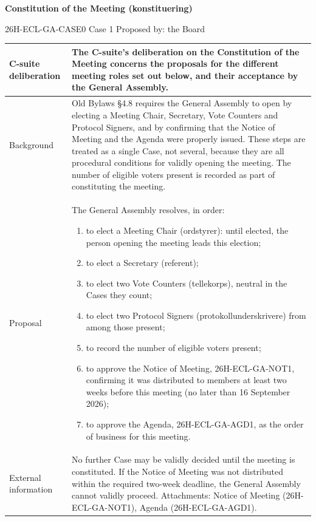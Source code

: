 \documentclass{../../../Common/Latex/Templates/rapport}
\begin{document}
\reportmainmatter
\small
\setlength{\parindent}{0pt}
\setlength{\tabcolsep}{6pt}
\renewcommand{\arraystretch}{1.2}

\begin{center}
  {\Large\bfseries Constitution of the Meeting (konstituering)}\par
  \vspace{0.15cm}
  {\normalsize 26H-ECL-GA-CASE0 \textperiodcentered{} Case 1 \textperiodcentered{} Proposed by: the Board}\par
  \vspace{0.1cm}
  {\small \meetingline}\par
\end{center}

\vspace{0.3cm}
\begin{tabularx}{\textwidth}{|>{\bfseries\raggedright\arraybackslash}p{4.2cm}|X|}
  \hline
  C-suite deliberation & The C-suite's deliberation on the Constitution of the Meeting concerns the proposals for the different meeting roles set out below, and their acceptance by the General Assembly. \\
  \hline
  Background           & Old Bylaws \S4.8 requires the General Assembly to open by electing a Meeting Chair, Secretary, Vote Counters and Protocol Signers, and by confirming that the Notice of Meeting and the Agenda were properly issued. These steps are treated as a single Case, not several, because they are all procedural conditions for validly opening the meeting. The number of eligible voters present is recorded as part of constituting the meeting. \\
  \hline
  Proposal             & The General Assembly resolves, in order:
  \begin{enumerate}[label=(\alph*), leftmargin=1.4em, itemsep=0.25em, topsep=0.2em]
    \item to elect a Meeting Chair (ordstyrer): until elected, the person opening the meeting leads this election;
    \item to elect a Secretary (referent);
    \item to elect two Vote Counters (tellekorps), neutral in the Cases they count;
    \item to elect two Protocol Signers (protokollunderskrivere) from among those present;
    \item to record the number of eligible voters present;
    \item to approve the Notice of Meeting, 26H-ECL-GA-NOT1, confirming it was distributed to members at least two weeks before this meeting (no later than 16 September 2026);
    \item to approve the Agenda, 26H-ECL-GA-AGD1, as the order of business for this meeting.
  \end{enumerate} \\
  \hline
  External information & No further Case may be validly decided until the meeting is constituted. If the Notice of Meeting was not distributed within the required two-week deadline, the General Assembly cannot validly proceed. Attachments: Notice of Meeting (26H-ECL-GA-NOT1), Agenda (26H-ECL-GA-AGD1). \\
  \hline
\end{tabularx}
\end{document}
